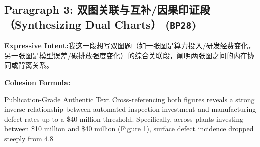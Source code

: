 \subsection*{Paragraph 3: 双图关联与互补/因果印证段（Synthesizing Dual Charts） (\texttt{BP28})}
\noindent\textbf{Expressive Intent:}\enspace 我这一段想写双图题（如一张图是算力投入/研发经费变化，另一张图是模型误差/碳排放强度变化）的综合关联段，阐明两张图之间的内在协同或背离关系。\par
\noindent\textbf{Cohesion Formula:}\par\vspace{4pt}
\begin{ExampleBox}{Publication-Grade Authentic Text}
Cross-referencing both figures reveals a strong inverse relationship between automated inspection investment and manufacturing defect rates up to a \$40 million threshold. Specifically, across plants investing between \$10 million and \$40 million (Figure 1), surface defect incidence dropped steeply from 4.8%
\end{ExampleBox}
